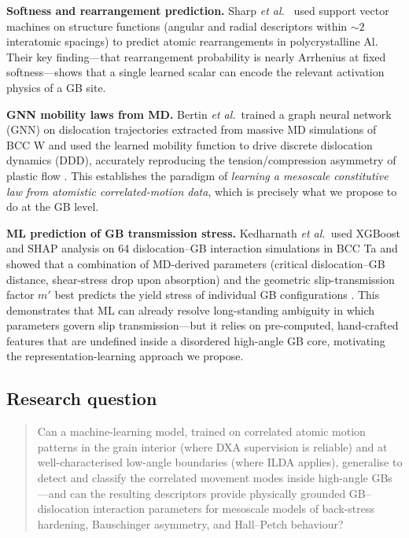 \documentclass[11pt]{article}
\begin{document}
\textbf{Softness and rearrangement prediction.} Sharp \emph{et al.}\ \cite{Sharp2018} used support vector machines on structure functions (angular and radial descriptors within ${\sim}2$ interatomic spacings) to predict atomic rearrangements in polycrystalline Al.
Their key finding---that rearrangement probability is nearly Arrhenius at fixed softness---shows that a single learned scalar can encode the relevant activation physics of a GB site.

\textbf{GNN mobility laws from MD.} Bertin \emph{et al.}\ trained a graph neural network (GNN) on dislocation trajectories extracted from massive MD simulations of BCC W and used the learned mobility function to drive discrete dislocation dynamics (DDD), accurately reproducing the tension/compression asymmetry of plastic flow \cite{Bertin2024}.
This establishes the paradigm of \emph{learning a mesoscale constitutive law from atomistic correlated-motion data}, which is precisely what we propose to do at the GB level.

\textbf{ML prediction of GB transmission stress.} Kedharnath \emph{et al.}\ used XGBoost and SHAP analysis on 64 dislocation--GB interaction simulations in BCC Ta and showed that a combination of MD-derived parameters (critical dislocation--GB distance, shear-stress drop upon absorption) and the geometric slip-transmission factor $m'$ best predicts the yield stress of individual GB configurations \cite{Kedharnath2024}.
This demonstrates that ML can already resolve long-standing ambiguity in which parameters govern slip transmission---but it relies on pre-computed, hand-crafted features that are undefined inside a disordered high-angle GB core, motivating the representation-learning approach we propose.

\subsection*{Research question}
\begin{quote}
Can a machine-learning model, trained on correlated atomic motion patterns in the grain interior (where DXA supervision is reliable) and at well-characterised low-angle boundaries (where ILDA applies), generalise to detect and classify the correlated movement modes inside high-angle GBs---and can the resulting descriptors provide physically grounded GB--dislocation interaction parameters for mesoscale models of back-stress hardening, Bauschinger asymmetry, and Hall--Petch behaviour?
\end{quote}
\end{document}
